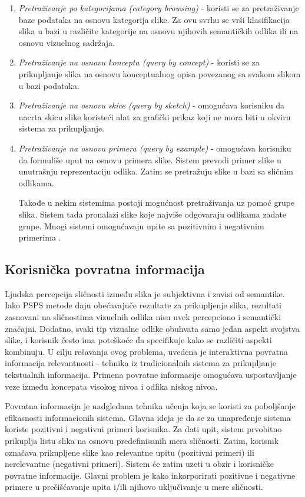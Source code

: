 \documentclass{article}
\begin{document}
\begin{enumerate}
\item \textit{Pretraživanje po kategorijama (category browsing)} - koristi se za pretraživanje baze podataka na osnovu kategorija slike. Za ovu svrhu se vrši klasifikacija slika u bazi u različite kategorije na osnovu njihovih semantičkih odlika ili na osnovu vizuelnog sadržaja.

\item \textit{Pretraživanje na osnovu koncepta (query by concept)} - koristi se za prikupljanje slika na osnovu konceptualnog opisa povezanog sa svakom slikom u bazi podataka.  
\item \textit{Pretraživanje na osnovu skice (query by sketch)} - omogućava korisniku da nacrta skicu slike koristeći alat za grafički prikaz koji ne mora biti u okviru sistema za prikupljanje.  
\item \textit{Pretraživanje na osnovu primera (query by example)} - omogućava korisniku da formuliše uput na osnovu primera slike. Sistem prevodi primer slike u unutrašnju reprezentaciju odlika. Zatim se pretražuju slike u bazi sa sličnim odlikama.

Takođe u nekim sistemima postoji mogućnost pretraživanja uz pomoć grupe slika. Sistem tada pronalazi slike koje najviše odgovaraju odlikama zadate grupe.
Mnogi sistemi omogućavaju upite sa pozitivnim i negativnim primerima \cite{long2003fundamentals}.
\end{enumerate}


\subsection{Korisnička povratna informacija}
Ljudska percepcija sličnosti između slika je subjektivna i zavisi od semantike. Iako PSPS metode daju obećavajuče rezultate za prikupljenje slika, rezultati zasnovani na sličnostima vizuelnih odlika nisu uvek percepciono i semantički značajni. Dodatno, svaki tip vizualne odlike obuhvata samo jedan aspekt svojstva slike, i korisnik često ima poteškoće da specifikuje kako se različiti aspekti kombinuju. U cilju rešavanja ovog problema, uvedena je interaktivna povratna informacija relevantnosti - tehnika iz tradicionalnih sistema za prikupljanje tekstualnih informacija. 
Primena povratne informacije omogućava uspostavljanje veze između koncepata visokog nivoa i odlika niskog nivoa.

Povratna informacija je nadgledana tehnika učenja koja se koristi za poboljšanje efikasnosti informacionih sistema. Glavna ideja je da se za unapređenje sistema koriste pozitivni i negativni primeri korisnika. Za dati upit, sistem prvobitno prikuplja listu slika na osnovu predefinisanih mera sličnosti. Zatim, korisnik označava prikupljene slike kao relevantne upitu (pozitivni primeri) ili nerelevantne (negativni primeri). Sistem će zatim uzeti u obzir i korisničke povratne informacije. Glavni problem je kako inkorporirati pozitivne i negativne primere u prečišćavanje upita i/ili njihovo uključivanje u mere sličnosti.
\end{document}

